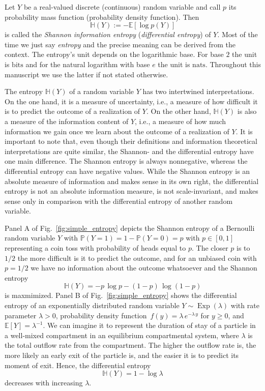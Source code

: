 \documentclass[smallextended]{svjour3}
\renewcommand{\P}{\mathbb{P}}
\newcommand{\E}{\mathbb{E}}
\renewcommand{\H}{\mathbb{H}}
\newcommand{\Exp}{\operatorname{Exp}}
\newcommand{\bits}{\mathrm{bits}}
\newcommand{\nats}{\mathrm{nats}}
\newcommand{\ie}{i.e.}
\newcommand{\pdf}{probability density function}
\begin{document}
Let $Y$ be a real-valued discrete (continuous) random variable and call $p$ its probability mass function (\pdf).
Then
\begin{equation*}
  \H(Y) := -\E\left[\log p(Y)\right]
\end{equation*}
is called the \emph{Shannon information entropy} (\emph{differential entropy}) of $Y$.
Most of the time we just say \emph{entropy} and the precise meaning can be derived from the context.
The entropy's unit depends on the logarithmic base.
For base $2$ the unit is \emph{$\bits$} and for the natural logarithm with base $e$ the unit is \emph{$\nats$}.
Throughout this manuscript we use the latter if not stated otherwise.

The entropy $\H(Y)$ of a random variable $Y$ has two intertwined interpretations.
On the one hand, it is a measure of uncertainty, \ie, a measure of how difficult it is to predict the outcome of a realization of $Y$.
On the other hand, $\H(Y)$ is also a measure of the information content of $Y$, \ie, a measure of how much information we gain once we learn about the outcome of a realization of $Y$.
It is important to note that, even though their definitions and information theoretical interpretations are quite similar, the Shannon- and the differential entropy have one main difference.
The Shannon entropy is always nonnegative, whereas the differential entropy can have negative values.
While the Shannon entropy is an absolute measure of information and makes sense in its own right, the differential entropy is not an absolute information measure, is not scale-invariant, and makes sense only in comparison with the differential entropy of another random variable.

Panel A of Fig.~\ref{fig:simple_entropy} depicts the Shannon entropy of a Bernoulli random variable $Y$ with $\P(Y=1)=1-\P(Y=0)=p$ with $p\in[0,1]$ representing a coin toss with probability of heads equal to $p$.
The closer $p$ is to $1/2$ the more difficult is it to predict the outcome, and for an unbiased coin with $p=1/2$ we have no information about the outcome whatsoever and the Shannon entropy
\begin{equation*}
	\H(Y) = -p\,\log p - (1-p)\,\log(1-p)
\end{equation*}
is maxmimized.
Panel B of Fig.~\ref{fig:simple_entropy} shows the differential entropy of an exponentially distributed random variable $Y\sim\Exp(\lambda)$ with rate parameter $\lambda>0$, \pdf\ $f(y) = \lambda\,e^{-\lambda\,y}$ for $y\geq0$, and $\E\left[Y\right]=\lambda^{-1}$.
We can imagine it to represent the duration of stay of a particle in a well-mixed compartment in an equilibrium compartmental system, where $\lambda$ is the total outflow rate from the compartment.
The higher the outflow rate is, the more likely an early exit of the particle is, and the easier it is to predict its moment of exit.
Hence, the differential entropy 
\begin{equation*}
	\H(Y) = 1-\log\lambda
\end{equation*}
decreases with increasing $\lambda$.
\end{document}
